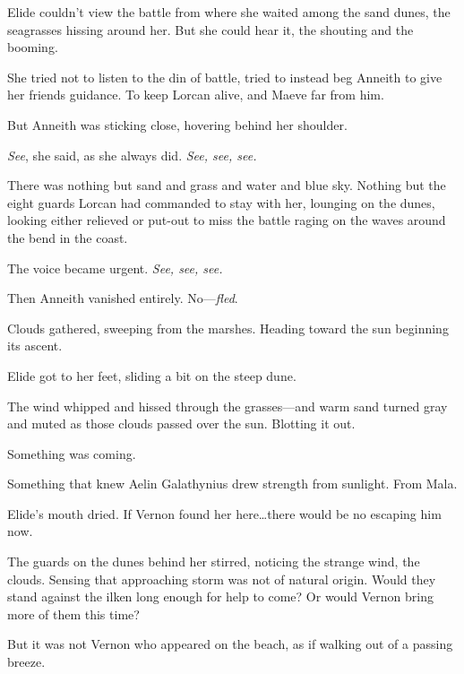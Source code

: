 Elide couldn't view the battle from where she waited among the sand dunes, the seagrasses hissing around her.
But she could hear it, the shouting and the booming.

She tried not to listen to the din of battle, tried to instead beg Anneith to give her friends guidance.
To keep Lorcan alive, and Maeve far from him.

But Anneith was sticking close, hovering behind her shoulder.

\emph{See}, she said, as she always did.
\emph{See, see, see.}

There was nothing but sand and grass and water and blue sky.
Nothing but the eight guards Lorcan had commanded to stay with her, lounging on the dunes, looking either relieved or put-out to miss the battle raging on the waves around the bend in the coast.

The voice became urgent.
\emph{See, see, see.}

Then Anneith vanished entirely.
No---\emph{fled}.

Clouds gathered, sweeping from the marshes.
Heading toward the sun beginning its ascent.

Elide got to her feet, sliding a bit on the steep dune.

The wind whipped and hissed through the grasses---and warm sand turned gray and muted as those clouds passed over the sun.
Blotting it out.

Something was coming.

Something that knew Aelin Galathynius drew strength from sunlight.
From Mala.

Elide's mouth dried.
If Vernon found her here\ldots there would be no escaping him now.

The guards on the dunes behind her stirred, noticing the strange wind, the clouds.
Sensing that approaching storm was not of natural origin.
Would they stand against the ilken long enough for help to come?
Or would Vernon bring more of them this time?

But it was not Vernon who appeared on the beach, as if walking out of a passing breeze.
